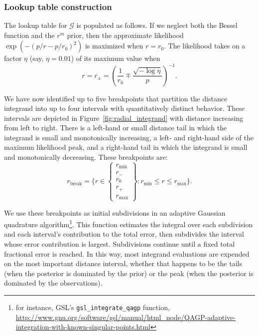 \documentclass[amsmath,amssymb,aps,prx,reprint,nopreprintnumbers,nofootinbib]{revtex4-1}
\begin{document}
\subsubsection{Lookup table construction}

The lookup table for $\mathscr{G}$ is populated as follows. If we neglect both the Bessel function and the $r^m$ prior, then the approximate likelihood $\exp(-(p/r-p/r_0)^2)$ is maximized when $r = r_0$. The likelihood takes on a factor $\eta$ (say, $\eta=0.01$) of its maximum value when
%
\begin{equation}
    r = r_\pm = \left(\frac{1}{r_0} \mp \frac{\sqrt{-\log\eta}}{p}\right)^{-1}.
\end{equation}

We have now identified up to five breakpoints that partition the distance integrand into up to four intervals with quantitatively distinct behavior. These intervals are depicted in Figure~\ref{fig:radial_integrand} with distance increasing from left to right. There is a left\nobreakdashes-hand or small distance tail in which the integrand is small and monotonically increasing, a left\nobreakdashes- and right\nobreakdashes-hand side of the maximum likelihood peak, and a right\nobreakdashes-hand tail in which the integrand is small and monotonically decreasing. These breakpoints are:
%
\begin{equation}
    r_\mathrm{break} = \{ r \in
    \left\{
    \begin{array}{c}
    r_\mathrm{min} \\
    r_- \\
    r_0 \\
    r_+ \\
    r_\mathrm{max}
    \end{array}
    \right\} :
    r_\mathrm{min} \leq r
    \leq r_\mathrm{max}\}.
\end{equation}

We use these breakpoints as initial subdivisions in an adaptive Gaussian quadrature algorithm\footnote{for instance, \ac{GSL}'s \texttt{gsl\_integrate\_qagp} function, \url{http://www.gnu.org/software/gsl/manual/html_node/QAGP-adaptive-integration-with-known-singular-points.html}}. This function estimates the integral over each subdivision and each interval's contribution to the total error, then subdivides the interval whose error contribution is largest. Subdivisions continue until a fixed total fractional error is reached. In this way, most integrand evaluations are expended on the most important distance interval, whether that happens to be the tails (when the posterior is dominated by the prior) or the peak (when the posterior is dominated by the observations).
\end{document}

